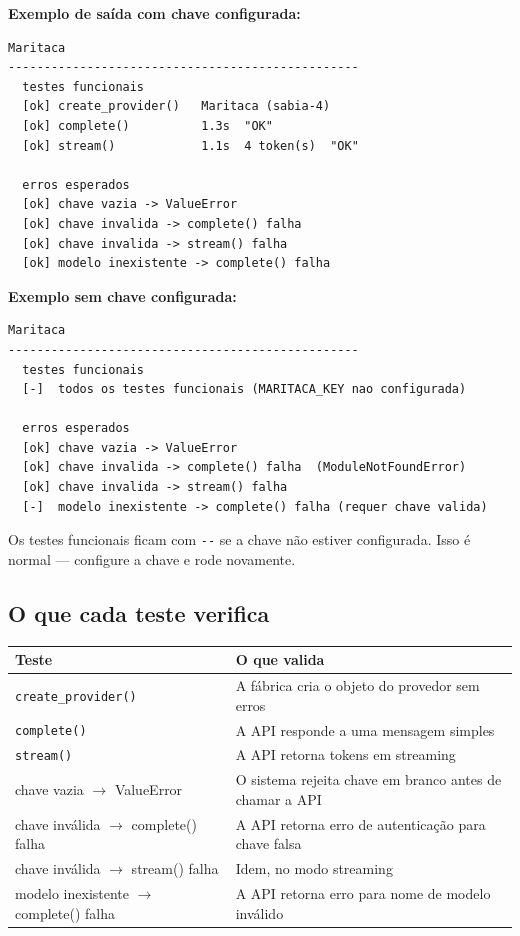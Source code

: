 \documentclass[12pt,a4paper]{article}
\newenvironment{nota}{%
  \begin{mdframed}[backgroundcolor=notecolor,linecolor=noteframe,linewidth=1.5pt,
    leftmargin=0pt,rightmargin=0pt,innerleftmargin=10pt,innerrightmargin=10pt,
    innertopmargin=8pt,innerbottommargin=8pt]
  \small
}{%
  \end{mdframed}
}
\begin{document}
\textbf{Exemplo de saída com chave configurada:}

\begin{lstlisting}
Maritaca
-------------------------------------------------
  testes funcionais
  [ok] create_provider()   Maritaca (sabia-4)
  [ok] complete()          1.3s  "OK"
  [ok] stream()            1.1s  4 token(s)  "OK"

  erros esperados
  [ok] chave vazia -> ValueError
  [ok] chave invalida -> complete() falha
  [ok] chave invalida -> stream() falha
  [ok] modelo inexistente -> complete() falha
\end{lstlisting}

\textbf{Exemplo sem chave configurada:}

\begin{lstlisting}
Maritaca
-------------------------------------------------
  testes funcionais
  [-]  todos os testes funcionais (MARITACA_KEY nao configurada)

  erros esperados
  [ok] chave vazia -> ValueError
  [ok] chave invalida -> complete() falha  (ModuleNotFoundError)
  [ok] chave invalida -> stream() falha
  [-]  modelo inexistente -> complete() falha (requer chave valida)
\end{lstlisting}

\begin{nota}
Os testes funcionais ficam com \texttt{-{}-} se a chave não estiver configurada. Isso é
normal --- configure a chave e rode novamente.
\end{nota}

\subsection{O que cada teste verifica}

\begin{tabularx}{\linewidth}{lL}
  \toprule
  \textbf{Teste} & \textbf{O que valida} \\
  \midrule
  \texttt{create\_provider()} & A fábrica cria o objeto do provedor sem erros \\
  \texttt{complete()} & A API responde a uma mensagem simples \\
  \texttt{stream()} & A API retorna tokens em streaming \\
  chave vazia $\to$ ValueError & O sistema rejeita chave em branco antes de chamar a API \\
  chave inválida $\to$ complete() falha & A API retorna erro de autenticação para chave falsa \\
  chave inválida $\to$ stream() falha & Idem, no modo streaming \\
  modelo inexistente $\to$ complete() falha & A API retorna erro para nome de modelo inválido \\
  \bottomrule
\end{tabularx}
\end{document}
